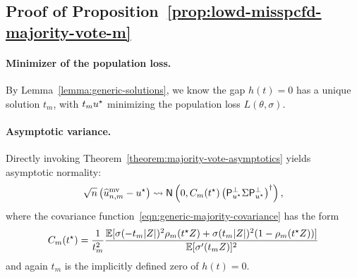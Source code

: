 
\subsection{Proof of Proposition~\ref{prop:lowd-misspcfd-majority-vote-m}}  \label{proof:lowd-misspcfd-majority-vote-m}

\paragraph{Minimizer of the population loss.} 
By Lemma~\ref{lemma:generic-solutions}, we know the gap $h(t)=0$ has a
unique solution $t_m$, with $t_m u^\star$ minimizing the population loss
$L(\theta, \sigma)$.

\paragraph{Asymptotic variance.} 
Directly invoking Theorem~\ref{theorem:majority-vote-asymptotics} yields
asymptotic normality:
\begin{equation*}
  \sqrt{n}\left(\widehat{u}^{\textup{mv}}_{n,m} - u^\star\right)
  \rightsquigarrow \mathsf{N}\left({0, C_m(t^\star) \left({\mathsf{P}_{u^\star}^\perp \Sigma \mathsf{P}_{u^\star}^\perp}\right)^\dagger}\right),
\end{equation*}
where the covariance function~\eqref{eqn:generic-majority-covariance} has the
form
\begin{equation}
  C_m(t^\star) = \frac{1}{t_m^2} \frac{\mathbb{E}[\sigma(-t_m |Z|)^2
      \rho_m(t^\star Z) + \sigma(t_m |Z|)^2 (1 - \rho_m(t^\star Z))]}{
    \mathbb{E}[\sigma'(t_m Z)]^2} \label{eqn:mis-majority-covariance}
\end{equation}
and again $t_m$ is the implicitly defined zero of $h(t) = 0$.


